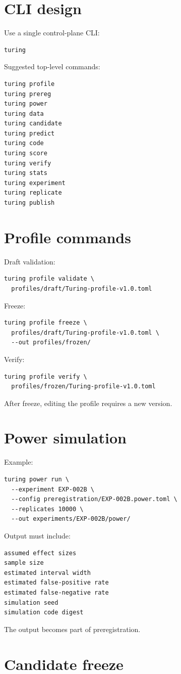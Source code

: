 \documentclass[11pt]{article}
\begin{document}
\section{CLI design}

Use a single control-plane CLI:
\begin{verbatim}
turing
\end{verbatim}
Suggested top-level commands:
\begin{verbatim}
turing profile
turing prereg
turing power
turing data
turing candidate
turing predict
turing code
turing score
turing verify
turing stats
turing experiment
turing replicate
turing publish
\end{verbatim}

\section{Profile commands}

Draft validation:
\begin{verbatim}
turing profile validate \
  profiles/draft/Turing-profile-v1.0.toml
\end{verbatim}
Freeze:
\begin{verbatim}
turing profile freeze \
  profiles/draft/Turing-profile-v1.0.toml \
  --out profiles/frozen/
\end{verbatim}
Verify:
\begin{verbatim}
turing profile verify \
  profiles/frozen/Turing-profile-v1.0.toml
\end{verbatim}
After freeze, editing the profile requires a new version.

\section{Power simulation}

Example:
\begin{verbatim}
turing power run \
  --experiment EXP-002B \
  --config preregistration/EXP-002B.power.toml \
  --replicates 10000 \
  --out experiments/EXP-002B/power/
\end{verbatim}
Output must include:
\begin{verbatim}
assumed effect sizes
sample size
estimated interval width
estimated false-positive rate
estimated false-negative rate
simulation seed
simulation code digest
\end{verbatim}
The output becomes part of preregistration.

\section{Candidate freeze}
\end{document}
